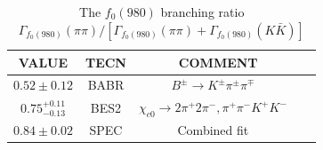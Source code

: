 {\begin{table}
    \caption{The $f_{0}(980)$ branching ratio $\Gamma_{f_{0}(980)}(\pi\pi) / \left[ \Gamma_{f_{0}(980)}(\pi\pi)+\Gamma_{f_{0}(980)}(K\bar{K})\right]$}
    \label{f0-KK-pipi}
    \begin{center}
        \begin{tabular}{cccc}
            \toprule
            VALUE &         TECN & COMMENT\\
            \hline
            $0.52\pm0.12$ &             BABR    & $B^{\pm} \rightarrow K^{\pm}\pi^{\pm}\pi^{\mp}$   ~\cite{pipi-KK-1} \\
            $0.75_{-0.13}^{+0.11}$ &    BES2    & $\chi_{c0} \rightarrow 2\pi^{+}2\pi^{-}, \pi^{+}\pi^{-}K^{+}K^{-}$   ~\cite{pipi-KK-2} \\
            $0.84\pm0.02$ &             SPEC    & Combined fit   ~\cite{pipi-KK-3} \\
            \bottomrule
        \end{tabular}
    \end{center}
\end{table}





}

